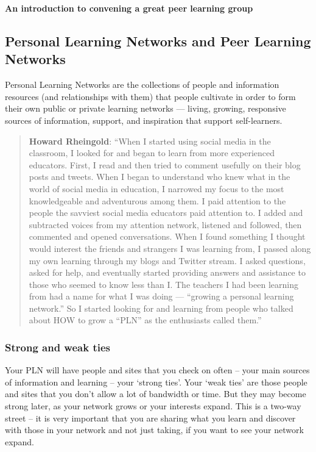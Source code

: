 \textbf{An introduction to convening a great peer learning group}

\subsection{Personal Learning Networks and Peer Learning Networks}

Personal Learning Networks are the collections of people and information
resources (and relationships with them) that people cultivate in order
to form their own public or private learning networks --- living,
growing, responsive sources of information, support, and inspiration
that support self-learners.

\begin{quote}
\textbf{Howard Rheingold}: ``When I started using social media in the
classroom, I looked for and began to learn from more experienced
educators. First, I read and then tried to comment usefully on their
blog posts and tweets. When I began to understand who knew what in the
world of social media in education, I narrowed my focus to the most
knowledgeable and adventurous among them. I paid attention to the people
the savviest social media educators paid attention to. I added and
subtracted voices from my attention network, listened and followed, then
commented and opened conversations. When I found something I thought
would interest the friends and strangers I was learning from, I passed
along my own learning through my blogs and Twitter stream. I asked
questions, asked for help, and eventually started providing answers and
assistance to those who seemed to know less than I. The teachers I had
been learning from had a name for what I was doing --- ``growing a
personal learning network.'' So I started looking for and learning from
people who talked about HOW to grow a ``PLN'' as the enthusiasts called
them.''
\end{quote}
\subsubsection{Strong and weak ties}

Your PLN will have people and sites that you check on often -- your main
sources of information and learning -- your `strong ties'. Your `weak
ties' are those people and sites that you don't allow a lot of bandwidth
or time. But they may become strong later, as your network grows or your
interests expand. This is a two-way street -- it is very important that
you are sharing what you learn and discover with those in your network
and not just taking, if you want to see your network expand.

